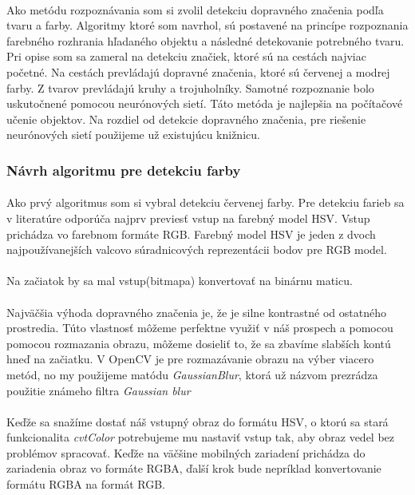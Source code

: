 \documentclass[12pt]{article}
\begin{document}
\paragraph{}
Ako metódu rozpoznávania som si zvolil detekciu dopravného značenia podľa tvaru a farby. 
Algoritmy ktoré som navrhol, sú postavené na princípe rozpoznania farebného rozhrania hľadaného objektu a následné detekovanie potrebného tvaru.
Pri opise som sa zameral na detekciu značiek, ktoré sú na cestách najviac početné.
Na cestách prevládajú dopravné značenia, ktoré sú červenej a modrej farby. Z tvarov prevládajú kruhy a trojuholníky.
Samotné rozpoznanie bolo uskutočnené pomocou neurónových sietí. Táto metóda je najlepšia na počítačové učenie objektov.
Na rozdiel od detekcie dopravného značenia, pre riešenie neurónových sietí použijeme už existujúcu knižnicu.
\subsubsection{Návrh algoritmu pre detekciu farby}
\paragraph{}
Ako prvý algoritmus som si vybral detekciu červenej farby. Pre detekciu farieb sa v literatúre odporúča najprv previesť vstup na farebný model HSV. 
Vstup prichádza vo farebnom formáte RGB. Farebný model HSV je jeden z dvoch najpoužívanejších valcovo súradnicových reprezentácii bodov pre RGB model.
\cite{hsl_hsv_wiki_en}
\paragraph{}
Na začiatok by sa mal vstup(bitmapa) konvertovať na binárnu maticu.
\paragraph{}
Najväčšia výhoda dopravného značenia je, že je silne kontrastné od ostatného prostredia.
Túto vlastnosť môžeme perfektne využiť v náš prospech a pomocou pomocou rozmazania obrazu, môžeme dosieliť to,
že sa zbavíme slabších kontú hneď na začiatku. V OpenCV je pre rozmazávanie obrazu na výber viacero metód,
no my použijeme matódu \emph{GaussianBlur}, ktorá už názvom prezrádza použitie známeho filtra \emph{Gaussian blur}
\paragraph{}
Keďže sa snažíme dostať náš vstupný obraz do formátu HSV, o ktorú sa stará funkcionalita \emph{cvtColor} 
potrebujeme mu nastaviť vstup tak, aby obraz vedel bez problémov spracovať. 
Keďže na väčšine mobilných zariadení prichádza do zariadenia obraz vo formáte RGBA, ďalší krok bude nepríklad konvertovanie formátu RGBA na formát RGB.
\end{document}
